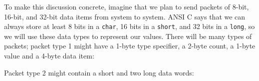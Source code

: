 To make this discussion concrete, imagine that we plan to send packets of
8-bit, 16-bit, and 32-bit data items from system to system. ANSI C says
that we can always store at least 8 bits in a \verb'char', 16 bits in a
\verb'short', and 32 bits in a \verb'long', so we will use these data types
to represent our values. There will be many types of packets; packet type 1
might have a 1-byte type specifier, a 2-byte count, a 1-byte value and a
4-byte data item:
\begin{center}
\end{center}
Packet type 2 might contain a short and two long data words:
\begin{center}
\end{center}

